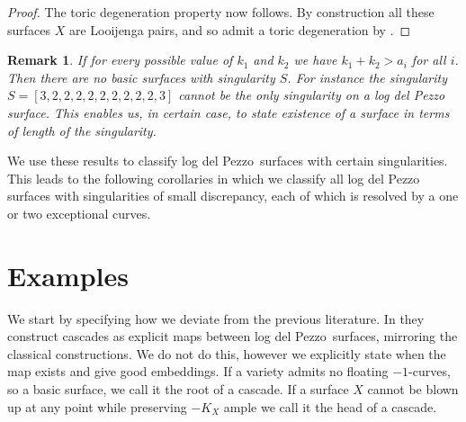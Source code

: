 \documentclass[12pt]{amsbook}
\theoremstyle{plain}
\newtheorem{cor}[thm]{Corollary}
\newtheorem*{rem}{Remark}
\newcommand{\ldp}{log del Pezzo}
\newcommand{\mb}[1]{\mathbb{#1}}
\newcommand{\LJ}{Looijenga pair}
\begin{document}
\begin{proof}
The toric degeneration property now follows. By construction all these surfaces $X$ are \LJ s,
and so admit a toric degeneration by \cite[Theorem ??]{GHK}.
\end{proof}

\begin{rem}\rm
If for every possible value of $k_1$ and $k_2$ we have $k_1 + k_2 > a_i$ for all $i$. Then there are no basic surfaces with singularity $S$. For instance the singularity $S = [3,2,2,2,2,2,2,2,2,2,3]$ cannot be the only singularity on a log del Pezzo surface. This enables us, in certain case, to state existence of a surface in terms of length of the singularity.
\end{rem}
\begin{comment}
\begin{cor}
Let $S$ be a singularity with small discrepancy, $-a_1, \dots , -a_n$ be the self-intersection of the resolutions. Then if $n \geq \max (a_i) + 5 $. Then there exists no \ldp\ with only singularities of type $S$.
\end{cor}
\end{comment}

We use these results to classify \ldp\ surfaces with certain singularities. This leads to the following corollaries in which we classify all log del Pezzo surfaces with singularities of small discrepancy, each of which is resolved by a one or two exceptional curves.
 
\section{Examples}
 
We start by specifying how we deviate from the previous literature. In \cite{ReidSuzuki} they construct cascades as explicit maps between \ldp\ surfaces, mirroring the classical constructions. We do not do this, however we explicitly state when the map exists and give good embeddings. If a variety admits no floating $-1$-curves, so a basic surface, we call it the root of a cascade. If a surface $X$ cannot be blown up at any point while preserving ${-}K_X$ ample we call it the head of a cascade. 
\end{document}
